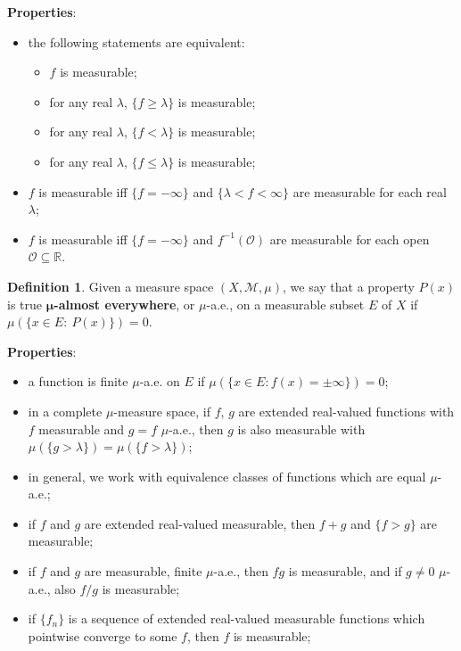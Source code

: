 \documentclass[11pt]{amsart}
\theoremstyle{definition}
\newtheorem*{definition*}{Definition}
\renewcommand\geq{\geqslant}
\renewcommand\leq{\leqslant}
\renewcommand\:{\colon}
\newcommand{\calM}{\mathcal{M}}
\newcommand{\calO}{\mathcal{O}}
\newcommand{\R}{\mathds{R}}
\begin{document}
\noindent \textbf{Properties}:
\begin{itemize}[leftmargin=*]\setlength\itemsep{0em}
	\item the following statements are equivalent:
	\begin{itemize}[leftmargin=*]\setlength\itemsep{0em}
		\item $f$ is measurable;
		\item for any real $\lambda$, $\{f \geq \lambda\}$ is measurable;
		\item for any real $\lambda$, $\{f < \lambda\}$ is measurable;
		\item for any real $\lambda$, $\{f \leq \lambda\}$ is measurable;
	\end{itemize}
	\item $f$ is measurable iff $\{f = -\infty\}$ and $\{\lambda < f < \infty\}$ are measurable for each real $\lambda$;
	\item $f$ is measurable iff $\{f = -\infty\}$ and $f^{-1}(\calO)$ are measurable for each open $\calO \subseteq \R$.
\end{itemize}

\begin{definition*}
	Given a measure space $(X, \calM, \mu)$, we say that a property $P(x)$ is true \textbf{$\boldsymbol{\mu}$-almost everywhere}, or $\mu$-a.e., on a measurable subset $E$ of $X$ if $\mu(\{x \in E : \ P(x)\}) = 0$.
\end{definition*}

\noindent \textbf{Properties}:
\begin{itemize}[leftmargin=*]\setlength\itemsep{0em}
	\item a function is finite $\mu$-a.e. on $E$ if $\mu(\{ x \in E : f(x) = \pm \infty\}) = 0$;
	\item in a complete $\mu$-measure space, if $f$, $g$ are extended real-valued functions with $f$ measurable and $g = f$ $\mu$-a.e., then $g$ is also measurable with $\mu(\{ g > \lambda \}) = \mu(\{ f > \lambda \})$;
	\item in general, we work with equivalence classes of functions which are equal $\mu$-a.e.;
	\item if $f$ and $g$ are extended real-valued measurable, then $f + g$ and $\{f > g\}$ are measurable;
	\item if $f$ and $g$ are measurable, finite $\mu$-a.e., then $fg$ is measurable, and if $g \neq 0$ $\mu$-a.e., also $f/g$ is measurable;
	\item if $\{f_n\}$ is a sequence of extended real-valued measurable functions which pointwise converge to some $f$, then $f$ is measurable;
\end{itemize}
\end{document}
